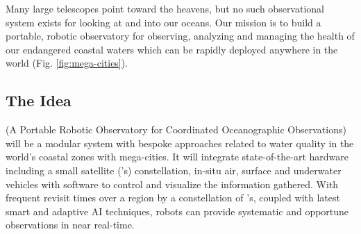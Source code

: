 \documentclass[12pt]{article}
\begin{document}
Many large telescopes point toward the heavens, but no such
observational system exists for looking at and into our oceans.  Our
mission is to build a portable, robotic observatory for observing,
analyzing and managing the health of our endangered coastal waters
which can be rapidly deployed anywhere in the world
(Fig. \ref{fig:mega-cities}).

\vspace*{-0.2cm}
\subsection{The Idea}

\pro (A Portable Robotic Observatory for Coordinated Oceanographic
Observations) will be a modular system with bespoke approaches related
to water quality in the world's coastal zones with mega-cities. It
will integrate state-of-the-art hardware including a small satellite
(\smle's) constellation, in-situ air, surface and underwater vehicles
with software to control and visualize the information gathered. With
frequent revisit times over a region by a constellation of \smle's,
coupled with latest smart and adaptive AI techniques, robots can
provide systematic and opportune observations in near real-time.



\end{document}
